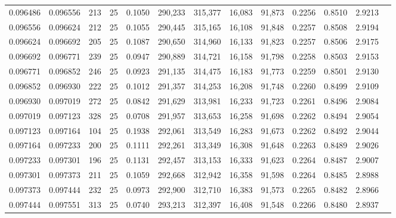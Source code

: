 \begin{tabular}{rrrrrrrrrrrrr}
0.096486 & 0.096556 &   213 &  25 &                                     0.1050 & 290,233 & 315,377 &  16,083 &  91,873 & 0.2256 & 0.8510 & 2.9213 \\
0.096556 & 0.096624 &   212 &  25 &                                     0.1055 & 290,445 & 315,165 &  16,108 &  91,848 & 0.2257 & 0.8508 & 2.9194 \\
0.096624 & 0.096692 &   205 &  25 &                                     0.1087 & 290,650 & 314,960 &  16,133 &  91,823 & 0.2257 & 0.8506 & 2.9175 \\
0.096692 & 0.096771 &   239 &  25 &                                     0.0947 & 290,889 & 314,721 &  16,158 &  91,798 & 0.2258 & 0.8503 & 2.9153 \\
0.096771 & 0.096852 &   246 &  25 &                                     0.0923 & 291,135 & 314,475 &  16,183 &  91,773 & 0.2259 & 0.8501 & 2.9130 \\
0.096852 & 0.096930 &   222 &  25 &                                     0.1012 & 291,357 & 314,253 &  16,208 &  91,748 & 0.2260 & 0.8499 & 2.9109 \\
0.096930 & 0.097019 &   272 &  25 &                                     0.0842 & 291,629 & 313,981 &  16,233 &  91,723 & 0.2261 & 0.8496 & 2.9084 \\
0.097019 & 0.097123 &   328 &  25 &                                     0.0708 & 291,957 & 313,653 &  16,258 &  91,698 & 0.2262 & 0.8494 & 2.9054 \\
0.097123 & 0.097164 &   104 &  25 &                                     0.1938 & 292,061 & 313,549 &  16,283 &  91,673 & 0.2262 & 0.8492 & 2.9044 \\
0.097164 & 0.097233 &   200 &  25 &                                     0.1111 & 292,261 & 313,349 &  16,308 &  91,648 & 0.2263 & 0.8489 & 2.9026 \\
0.097233 & 0.097301 &   196 &  25 &                                     0.1131 & 292,457 & 313,153 &  16,333 &  91,623 & 0.2264 & 0.8487 & 2.9007 \\
0.097301 & 0.097373 &   211 &  25 &                                     0.1059 & 292,668 & 312,942 &  16,358 &  91,598 & 0.2264 & 0.8485 & 2.8988 \\
0.097373 & 0.097444 &   232 &  25 &                                     0.0973 & 292,900 & 312,710 &  16,383 &  91,573 & 0.2265 & 0.8482 & 2.8966 \\
0.097444 & 0.097551 &   313 &  25 &                                     0.0740 & 293,213 & 312,397 &  16,408 &  91,548 & 0.2266 & 0.8480 & 2.8937 \\

\end{tabular}

